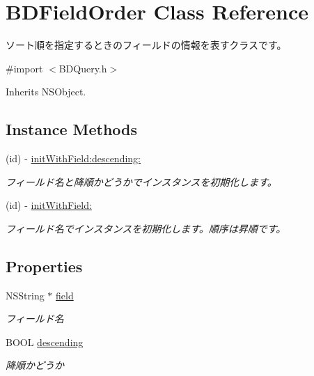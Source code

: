 \hypertarget{interface_b_d_field_order}{\section{B\-D\-Field\-Order Class Reference}
\label{interface_b_d_field_order}
}


ソート順を指定するときのフィールドの情報を表すクラスです。  




{\ttfamily \#import $<$B\-D\-Query.\-h$>$}



Inherits N\-S\-Object.

\subsection*{Instance Methods}
\begin{DoxyCompactItemize}
\item 
(id) -\/ \hyperlink{interface_b_d_field_order_a67e91bb49d54692d80b485f31d6e44fd}{init\-With\-Field\-:descending\-:}
\begin{DoxyCompactList}\small\item\em フィールド名と降順かどうかでインスタンスを初期化します。 \end{DoxyCompactList}\item 
(id) -\/ \hyperlink{interface_b_d_field_order_aa955edc98c8850fcb2fea0eac5466cb2}{init\-With\-Field\-:}
\begin{DoxyCompactList}\small\item\em フィールド名でインスタンスを初期化します。順序は昇順です。 \end{DoxyCompactList}\end{DoxyCompactItemize}
\subsection*{Properties}
\begin{DoxyCompactItemize}
\item 
\hypertarget{interface_b_d_field_order_a540407ddce357acbc23006f323a887e6}{N\-S\-String $\ast$ \hyperlink{interface_b_d_field_order_a540407ddce357acbc23006f323a887e6}{field}}\label{interface_b_d_field_order_a540407ddce357acbc23006f323a887e6}

\begin{DoxyCompactList}\small\item\em フィールド名 \end{DoxyCompactList}\item 
B\-O\-O\-L \hyperlink{interface_b_d_field_order_aa077f2778f44e8a368de24418b111ca5}{descending}
\begin{DoxyCompactList}\small\item\em 降順かどうか \end{DoxyCompactList}\end{DoxyCompactItemize}


